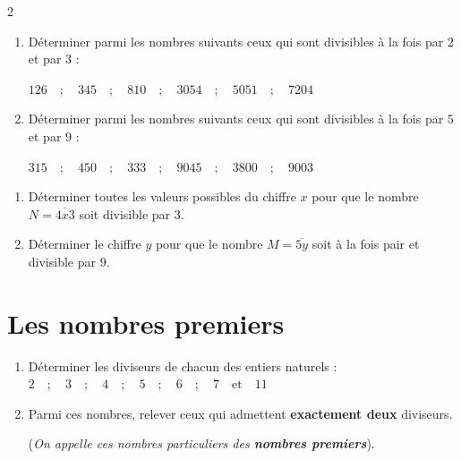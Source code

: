 \documentclass[10pt, a4paper]{article}
\begin{document}
\begin{multicols*}{2}
\begin{Application}[][15 min]
\begin{enumerate}[leftmargin=*,itemsep=0.5pt]
    \item Déterminer parmi les nombres suivants ceux qui sont divisibles à la fois par $2$ et par $3$ :
\begin{center}
    $126 \quad ; \quad 345 \quad ; \quad 810 \quad ; \quad 3054 \quad ; \quad 5051 \quad ; \quad 7204$
\end{center}
    \item Déterminer parmi les nombres suivants ceux qui sont divisibles à la fois par $5$ et par $9$ :
\begin{center}
    $315 \quad ; \quad 450 \quad ; \quad 333 \quad ; \quad 9045 \quad ; \quad 3800 \quad ; \quad 9003$
\end{center}
\end{enumerate}
\end{Application}

\begin{Application}[][15 min]
\begin{enumerate}[leftmargin=*,itemsep=0.5pt]
    \item Déterminer toutes les valeurs possibles du chiffre $x$ pour que le nombre $N = \overline{4x3}$ soit divisible par $3$.
    \item Déterminer le chiffre $y$ pour que le nombre $M = \overline{5y}$ soit à la fois pair et divisible par $9$.
\end{enumerate}
\end{Application}


\section{Les nombres premiers}

\begin{Activite}[][10 min]
\begin{enumerate}[leftmargin=*,itemsep=0.5pt]
    \item Déterminer les diviseurs de chacun des entiers naturels :
    $2 \quad ; \quad 3 \quad ; \quad 4 \quad ; \quad 5 \quad ; \quad 6 \quad ; \quad 7 \quad \text{et} \quad 11$

    \item Parmi ces nombres, relever ceux qui admettent \textbf{exactement deux} diviseurs.

    (\textit{On appelle ces nombres particuliers des \textbf{nombres premiers}}).


\end{enumerate}
\end{Activite}
\end{multicols*}
\end{document}
